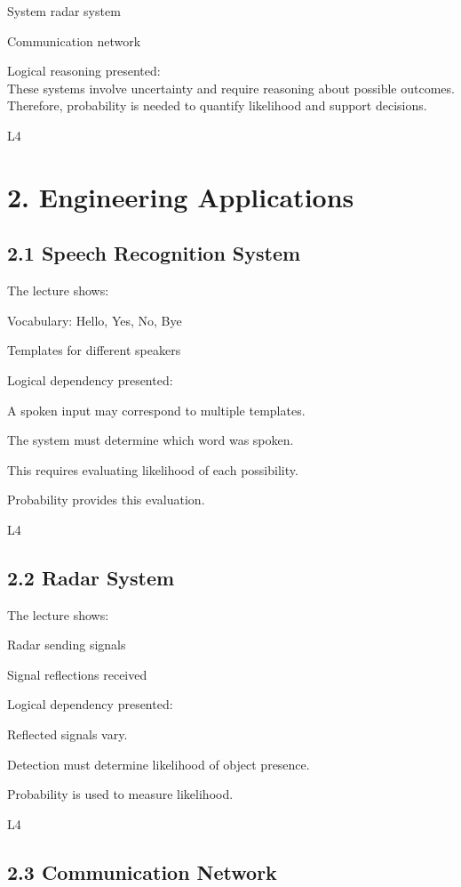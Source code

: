 \documentclass[12pt]{article}
\begin{document}
System radar system

Communication network

Logical reasoning presented: \\
These systems involve uncertainty and require reasoning about possible outcomes. \\
Therefore, probability is needed to quantify likelihood and support decisions. 

L4

\section*{2. Engineering Applications}

\subsection*{2.1 Speech Recognition System}

The lecture shows:

Vocabulary: Hello, Yes, No, Bye

Templates for different speakers

Logical dependency presented:

A spoken input may correspond to multiple templates.

The system must determine which word was spoken.

This requires evaluating likelihood of each possibility.

Probability provides this evaluation. 

L4

\subsection*{2.2 Radar System}

The lecture shows:

Radar sending signals

Signal reflections received

Logical dependency presented:

Reflected signals vary.

Detection must determine likelihood of object presence.

Probability is used to measure likelihood. 

L4

\subsection*{2.3 Communication Network}
\end{document}
